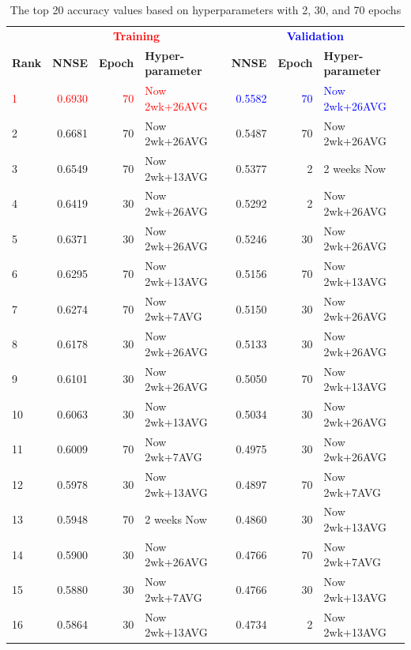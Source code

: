 \documentclass[utf8]{FrontiersinVancouver} %
\begin{document}
{\begin{table}[htb]
  \caption{The top 20 accuracy values based on hyperparameters with 2, 30, and 70 epochs}
  \label{tab:ranking-accuracy}
  \renewcommand{\arraystretch}{1.2}
  \begin{center}
    {\footnotesize  
\begin{tabular}{|l||r|r|l|r|r|l|}
  \hline
 &   \multicolumn{3}{c|}{\bf \textcolor{red}{Training}}  & \multicolumn{3}{c|}{\bf \textcolor{blue}{Validation}}  \\
{\bf Rank} &  {\bf NNSE} &  {\bf Epoch} & {\bf Hyper-parameter} & {\bf NNSE} &  {\bf Epoch} & {\bf Hyper-parameter}\\
\hline
\textcolor{red}{1}  &  \textcolor{red}{0.6930} &     \textcolor{red}{70} &  \textcolor{red}{Now 2wk+26AVG} &  \textcolor{blue}{0.5582} &     \textcolor{blue}{70} &  \textcolor{blue}{Now 2wk+26AVG} \\
2  &  0.6681 &     70 &  Now 2wk+26AVG &  0.5487 &     70 &  Now 2wk+26AVG \\
3  &  0.6549 &     70 &  Now 2wk+13AVG &  0.5377 &      2 &    2 weeks Now \\
4  &  0.6419 &     30 &  Now 2wk+26AVG &  0.5292 &      2 &  Now 2wk+26AVG \\
5  &  0.6371 &     30 &  Now 2wk+26AVG &  0.5246 &     30 &  Now 2wk+26AVG \\
6  &  0.6295 &     70 &  Now 2wk+13AVG &  0.5156 &     70 &  Now 2wk+13AVG \\
7  &  0.6274 &     70 &   Now 2wk+7AVG &  0.5150 &     30 &  Now 2wk+26AVG \\
8  &  0.6178 &     30 &  Now 2wk+26AVG &  0.5133 &     30 &  Now 2wk+26AVG \\
9  &  0.6101 &     30 &  Now 2wk+26AVG &  0.5050 &     70 &  Now 2wk+13AVG \\
10 &  0.6063 &     30 &  Now 2wk+13AVG &  0.5034 &     30 &  Now 2wk+26AVG \\
11 &  0.6009 &     70 &   Now 2wk+7AVG &  0.4975 &     30 &  Now 2wk+26AVG \\
12 &  0.5978 &     30 &  Now 2wk+13AVG &  0.4897 &     70 &   Now 2wk+7AVG \\
13 &  0.5948 &     70 &    2 weeks Now &  0.4860 &     30 &  Now 2wk+13AVG \\
14 &  0.5900 &     30 &  Now 2wk+26AVG &  0.4766 &     70 &   Now 2wk+7AVG \\
15 &  0.5880 &     30 &   Now 2wk+7AVG &  0.4766 &     30 &  Now 2wk+13AVG \\
16 &  0.5864 &     30 &  Now 2wk+13AVG &  0.4734 &      2 &  Now 2wk+13AVG \\

\end{tabular}}
\end{center}
\end{table}}
\end{document}
